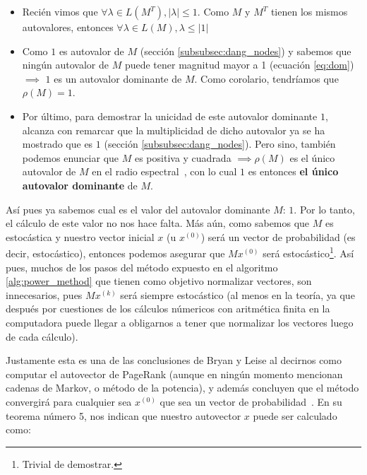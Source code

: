 \begin{itemize}
    \item Reci\'en vimos que $\forall\lambda\in L(M^T), |\lambda|\leq 1$. Como
        $M$ y $M^T$ tienen los mismos autovalores, entonces $\forall\lambda\in
        L(M), \lambda\leq\left|1\right|$\\

    \item Como $1$ es autovalor de $M$ (secci\'on \ref{subsubsec:dang_nodes}) y
        sabemos que ning\'un autovalor de $M$ puede tener magnitud mayor a 1
        (ecuaci\'on \ref{eq:dom})$\implies$ $1$ es un autovalor dominante de
        $M$.  Como corolario, tendr\'iamos que $\rho(M) = 1$.\\

    \item Por \'ultimo, para demostrar la unicidad de este autovalor dominante
        $1$, alcanza con remarcar que la multiplicidad de dicho autovalor ya se
        ha mostrado que es $1$ (secci\'on \ref{subsubsec:dang_nodes}). Pero
        sino, tambi\'en podemos enunciar que $M$ es positiva y cuadrada
        $\implies \rho(M)$ es el \'unico autovalor de $M$ en el radio
        espectral~\cite[p.664]{Meyer2000}, con lo cual $1$ es entonces
        \textbf{el \'unico autovalor dominante} de $M$.\\
\end{itemize}
\medskip

\par As\'i pues ya sabemos cual es el valor del autovalor dominante $M$: $1$.
Por lo tanto, el c\'alculo de este valor no nos hace falta.  M\'as a\'un, como
sabemos que $M$ es estoc\'astica y nuestro vector inicial $x$ (u $x^{(0)}$)
ser\'a un vector de probabilidad (es decir, estoc\'astico), entonces podemos
asegurar que $Mx^{(0)}$ ser\'a estoc\'astico\footnote{Trivial de demostrar.}.
As\'i pues, muchos de los pasos del m\'etodo expuesto en el algoritmo
\ref{alg:power_method} que tienen como objetivo normalizar vectores, son
innecesarios, pues $Mx^{(k)}$ ser\'a siempre estoc\'astico (al menos en la
teor\'ia, ya que despu\'es por cuestiones de los c\'alculos n\'umericos con
aritm\'etica finita en la computadora puede llegar a obligarnos a tener que
normalizar los vectores luego de cada c\'alculo).

\par Justamente esta es una de las conclusiones de Bryan y Leise al decirnos
como computar el autovector de PageRank (aunque en ning\'un momento mencionan
cadenas de Markov, o m\'etodo de la potencia), y adem\'as concluyen que el
m\'etodo convergir\'a para cualquier sea $x^{(0)}$ que sea un vector de
probabilidad~\cite[p.580]{Bryan2006}. En su teorema n\'umero 5, nos indican que
nuestro autovector $x$ puede ser calculado como:

